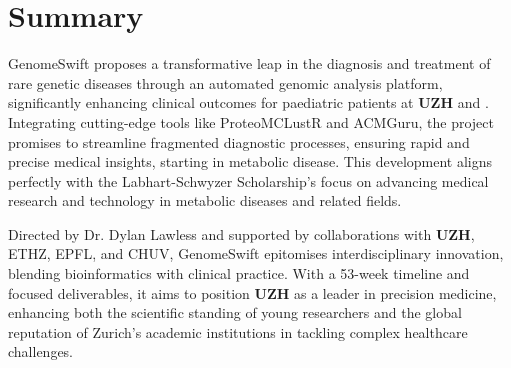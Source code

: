 \section{Summary}

GenomeSwift proposes a transformative leap in the diagnosis and treatment of rare genetic diseases through an automated genomic analysis platform, significantly enhancing clinical outcomes for paediatric patients at \textbf{UZH} and \kispi. Integrating cutting-edge tools like ProteoMCLustR and ACMGuru, the project promises to streamline fragmented diagnostic processes, ensuring rapid and precise medical insights,  starting in metabolic disease. This development aligns perfectly with the Labhart-Schwyzer Scholarship’s focus on advancing medical research and technology in metabolic diseases and related fields.

Directed by Dr. Dylan Lawless and supported by collaborations with \textbf{UZH}, ETHZ, EPFL, and CHUV, GenomeSwift epitomises interdisciplinary innovation, blending bioinformatics with clinical practice. With a 53-week timeline and focused deliverables, it aims to position \textbf{UZH} as a leader in precision medicine, enhancing both the scientific standing of young researchers and the global reputation of Zurich’s academic institutions in tackling complex healthcare challenges.


